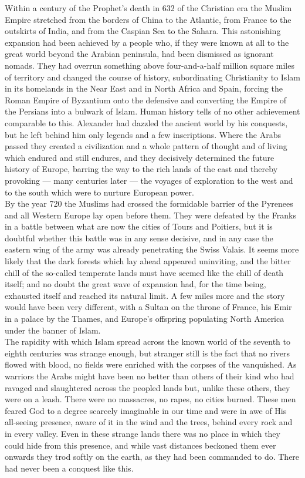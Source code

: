 \documentclass[10pt, twoside]{book}
\begin{document}
Within a century of the Prophet's death in 632 of the Christian era the Muslim Empire stretched from the borders of China to the Atlantic, from France to the outskirts of India, and from the Caspian Sea to the Sahara. This astonishing expansion had been achieved by a people who, if they were known at all to the great world beyond the Arabian peninsula, had been dismissed as ignorant nomads. They had overrun something above four\hyp{}and\hyp{}a\hyp{}half million square miles of territory and changed the course of history, subordinating Christianity to Islam in its homelands in the Near East and in North Africa and Spain, forcing the Roman Empire of Byzantium onto the defensive and converting the Empire of the Persians into a bulwark of Islam. Human history tells of no other achievement comparable to this. Alexander had dazzled the ancient world by his conquests, but he left behind him only legends and a few inscriptions. Where the Arabs passed they created a civilization and a whole pattern of thought and of living which endured and still endures, and they decisively determined the future history of Europe, barring the way to the rich lands of the east and thereby provoking --- many centuries later --- the voyages of exploration to the west and to the south which were to nurture European power. \\

By the year 720 the Muslims had crossed the formidable barrier of the Pyrenees and all Western Europe lay open before them. They were defeated by the Franks in a battle between what are now the cities of Tours and Poitiers, but it is doubtful whether this battle was in any sense decisive, and in any case the eastern wing of the army was already penetrating the Swiss Valais. It seems more likely that the dark forests which lay ahead appeared uninviting, and the bitter chill of the so\hyp{}called temperate lands must have seemed like the chill of death itself; and no doubt the great wave of expansion had, for the time being, exhausted itself and reached its natural limit. A few miles more and the story would have been very different, with a Sultan on the throne of France, his Emir in a palace by the Thames, and Europe's offspring populating North America under the banner of Islam. \\

The rapidity with which Islam spread across the known world of the seventh to eighth centuries was strange enough, but stranger still is the fact that no rivers flowed with blood, no fields were enriched with the corpses of the vanquished. As warriors the Arabs might have been no better than others of their kind who had ravaged and slaughtered across the peopled lands but, unlike these others, they were on a leash. There were no massacres, no rapes, no cities burned. These men feared God to a degree scarcely imaginable in our time and were in awe of His all\hyp{}seeing presence, aware of it in the wind and the trees, behind every rock and in every valley. Even in these strange lands there was no place in which they could hide from this presence, and while vast distances beckoned them ever onwards they trod softly on the earth, as they had been commanded to do. There had never been a conquest like this. \\
\end{document}
